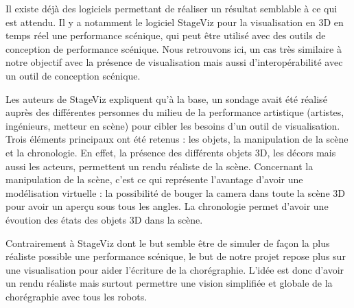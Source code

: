 Il existe déjà des logiciels permettant de réaliser un résultat semblable à ce qui est attendu. Il y a notamment le logiciel StageViz pour la visualisation en 3D en temps réel une performance scénique, qui peut être utilisé avec des outils de conception de performance scénique. Nous retrouvons ici, un cas très similaire à notre objectif avec la présence de visualisation mais aussi d'interopérabilité avec un outil de conception scénique.

Les auteurs de StageViz expliquent qu'à la base, un sondage avait été réalisé auprès des différentes personnes du milieu de la performance artistique (artistes, ingénieurs, metteur en scène) pour cibler les besoins d'un outil de visualisation. Trois éléments principaux ont été retenus : les objets, la manipulation de la scène et la chronologie. En effet, la présence des différents objets 3D, les décors mais aussi les acteurs, permettent un rendu réaliste de la scène. Concernant la manipulation de la scène, c'est ce qui représente l'avantage d'avoir une modélisation virtuelle : la possibilité de bouger la camera dans toute la scène 3D pour avoir un aperçu sous tous les angles. La chronologie permet d'avoir une évoution des états des objets 3D dans la scène.

Contrairement à StageViz dont le but semble être de simuler de façon la plus réaliste possible une performance scénique, le but de notre projet repose plus sur une visualisation pour aider l'écriture de la chorégraphie. L'idée est donc d'avoir un rendu réaliste mais surtout permettre une vision simplifiée et globale de la chorégraphie avec tous les robots.

%	
%
%
%
%
